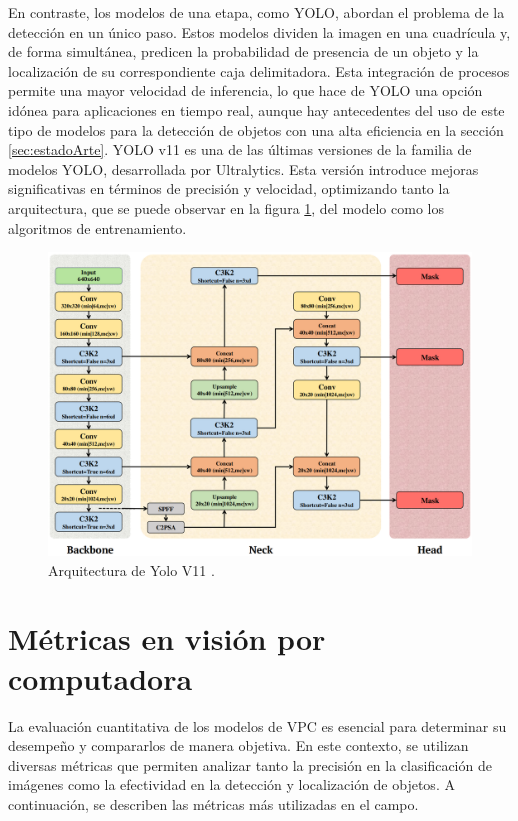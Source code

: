 En contraste, los modelos de una etapa, como YOLO, abordan el problema de la detección en un único paso. Estos modelos dividen la imagen en una cuadrícula y, de forma simultánea, predicen la probabilidad de presencia de un objeto y la localización de su correspondiente caja delimitadora. Esta integración de procesos permite una mayor velocidad de inferencia, lo que hace de YOLO una opción idónea para aplicaciones en tiempo real, aunque hay antecedentes del uso de este tipo de modelos para la detección de objetos con una alta eficiencia en la sección \ref{sec:estadoArte}.
YOLO v11 \citep{yolo11_ultralytics} es una de las últimas versiones de la familia de modelos YOLO, desarrollada por Ultralytics. Esta versión introduce mejoras significativas en términos de precisión y velocidad, optimizando tanto la arquitectura, que se puede observar en la figura \ref{fig:yolov11-arquitectura}, del modelo como los algoritmos de entrenamiento.
\begin{figure}[htpb]
	\centering
	\includegraphics[scale=0.3]{./Figures/yolov11_arquitectura.png}
	\caption{Arquitectura de Yolo V11 \protect\footnotemark.}
	\label{fig:yolov11-arquitectura}
\end{figure}


\section{Métricas en visión por computadora} \label{sec:metricasVisPC}

La evaluación cuantitativa de los modelos de VPC es esencial para determinar su desempeño y compararlos de manera objetiva. En este contexto, se utilizan diversas métricas que permiten analizar tanto la precisión en la clasificación de imágenes como la efectividad en la detección y localización de objetos. A continuación, se describen las métricas más utilizadas en el campo.


